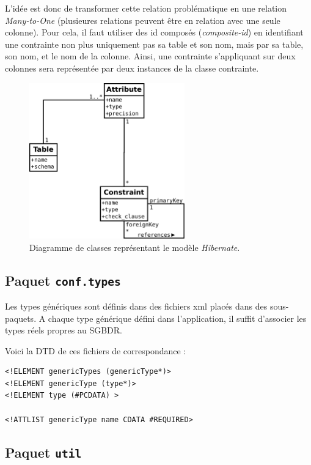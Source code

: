 L'idée est donc de transformer cette relation problématique en une relation \emph{Many-to-One} (plusieures relations peuvent être en relation avec une seule colonne). Pour cela, il faut utiliser des id composés (\emph{composite-id}) en identifiant une contrainte non plus uniquement pas sa table et son nom, mais par sa table, son nom, et le nom de la colonne. Ainsi, une contrainte s'appliquant sur deux colonnes sera représentée par deux instances de la classe contrainte.

\begin{figure}[H]
\includegraphics[width=0.6\textwidth]{files/diag_class_final}
\centering
\caption{Diagramme de classes représentant le modèle \emph{Hibernate}.}
\label{figure:diag_class_model_hibernate}
\end{figure}

\subsection{Paquet \texttt{conf.types}}
\label{subsection:conf.types}

Les types génériques sont définis dans des fichiers xml placés dans des sous-paquets. A chaque type générique défini dans l'application, il suffit d'associer les types réels propres au SGBDR. 

Voici la DTD de ces fichiers de correspondance : 
\begin{verbatim}
<!ELEMENT genericTypes (genericType*)>
<!ELEMENT genericType (type*)>
<!ELEMENT type (#PCDATA) >

<!ATTLIST genericType name CDATA #REQUIRED>
\end{verbatim}


\subsection{Paquet \texttt{util}}
\label{subsection:util}

